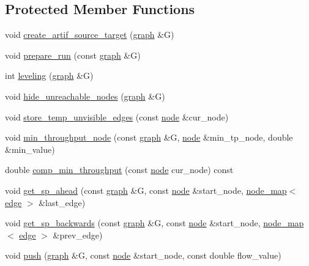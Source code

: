 \subsection*{Protected Member Functions}
\begin{DoxyCompactItemize}
\item 
void \mbox{\hyperlink{classmaxflow__pp_a02438e89291eeccda0b247d20ffa11e5}{create\+\_\+artif\+\_\+source\+\_\+target}} (\mbox{\hyperlink{classgraph}{graph}} \&G)
\item 
void \mbox{\hyperlink{classmaxflow__pp_a7a738741f8050df0cb0be0381aef0825}{prepare\+\_\+run}} (const \mbox{\hyperlink{classgraph}{graph}} \&G)
\item 
int \mbox{\hyperlink{classmaxflow__pp_adefb2cdc0145d57efd2d93c17a180896}{leveling}} (\mbox{\hyperlink{classgraph}{graph}} \&G)
\item 
void \mbox{\hyperlink{classmaxflow__pp_a93bb037fd3fc83c6558b560fc4da2340}{hide\+\_\+unreachable\+\_\+nodes}} (\mbox{\hyperlink{classgraph}{graph}} \&G)
\item 
void \mbox{\hyperlink{classmaxflow__pp_abb23812a3e8bca1955b835d3c41836e1}{store\+\_\+temp\+\_\+unvisible\+\_\+edges}} (const \mbox{\hyperlink{classnode}{node}} \&cur\+\_\+node)
\item 
void \mbox{\hyperlink{classmaxflow__pp_a9f820f51329f0e0ec4d8123547ae6ebd}{min\+\_\+throughput\+\_\+node}} (const \mbox{\hyperlink{classgraph}{graph}} \&G, \mbox{\hyperlink{classnode}{node}} \&min\+\_\+tp\+\_\+node, double \&min\+\_\+value)
\item 
double \mbox{\hyperlink{classmaxflow__pp_ab1146e40ae2f2405e0ca6ea3ff43a6ff}{comp\+\_\+min\+\_\+throughput}} (const \mbox{\hyperlink{classnode}{node}} cur\+\_\+node) const
\item 
void \mbox{\hyperlink{classmaxflow__pp_a340e4b9909a44ed7003760017c761e3b}{get\+\_\+sp\+\_\+ahead}} (const \mbox{\hyperlink{classgraph}{graph}} \&G, const \mbox{\hyperlink{classnode}{node}} \&start\+\_\+node, \mbox{\hyperlink{classnode__map}{node\+\_\+map}}$<$ \mbox{\hyperlink{classedge}{edge}} $>$ \&last\+\_\+edge)
\item 
void \mbox{\hyperlink{classmaxflow__pp_a58b7af1b215766e99adcca0994ecfb7a}{get\+\_\+sp\+\_\+backwards}} (const \mbox{\hyperlink{classgraph}{graph}} \&G, const \mbox{\hyperlink{classnode}{node}} \&start\+\_\+node, \mbox{\hyperlink{classnode__map}{node\+\_\+map}}$<$ \mbox{\hyperlink{classedge}{edge}} $>$ \&prev\+\_\+edge)
\item 
void \mbox{\hyperlink{classmaxflow__pp_ae7c9ce8d1cad511d70022e2f62567590}{push}} (\mbox{\hyperlink{classgraph}{graph}} \&G, const \mbox{\hyperlink{classnode}{node}} \&start\+\_\+node, const double flow\+\_\+value)

\end{DoxyCompactItemize}
